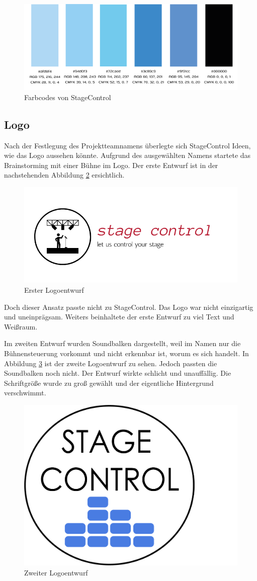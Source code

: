 \begin{figure}[H]
	\centering
	\includegraphics[width=0.7\linewidth]{images/Hexcode.png}
	\caption[Farbcodes von StageControl]{Farbcodes von StageControl}
	\label{fig:Hexcode}
\end{figure}


\subsection{Logo}
Nach der Festlegung des Projektteamnamens überlegte sich StageControl Ideen, wie das Logo aussehen könnte. Aufgrund des ausgewählten Namens startete das Brainstorming mit einer Bühne im Logo. Der erste Entwurf ist in der nachstehenden Abbildung \ref{fig:Logoentwurf1} ersichtlich. 

\begin{figure}[H]
	\centering
	\includegraphics[width=0.5\linewidth]{images/Logoentwurf1.png}
	\caption[Erster Logoentwurf]{Erster Logoentwurf}
	\label{fig:Logoentwurf1}
\end{figure}

Doch dieser Ansatz passte nicht zu StageControl. Das Logo war nicht einzigartig und uneinprägsam. Weiters beinhaltete der erste Entwurf zu viel Text und Weißraum.

\newpage
Im zweiten Entwurf wurden Soundbalken dargestellt, weil im Namen nur die Bühnensteuerung vorkommt und nicht erkennbar ist, worum es sich handelt. In Abbildung \ref{fig:Logoentwurf2} ist der zweite Logoentwurf zu sehen. Jedoch passten die Soundbalken noch nicht. Der Entwurf wirkte schlicht und unauffällig. Die Schriftgröße wurde zu groß gewählt und der eigentliche Hintergrund verschwimmt.

\begin{figure}[H]
	\centering
	\includegraphics[width=0.5\linewidth]{images/Logoentwurf2.png}
	\caption[Zweiter Logoentwurf]{Zweiter Logoentwurf}
	\label{fig:Logoentwurf2}
\end{figure}

